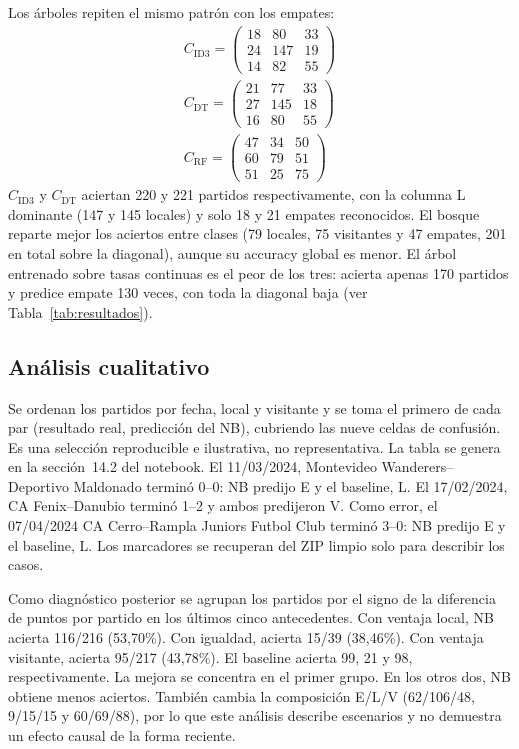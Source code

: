 \documentclass[conference]{IEEEtran}
\begin{document}
Los árboles repiten el mismo patrón con los empates:
\begin{gather*}
C_{\mathrm{ID3}}=
\begin{pmatrix}18&80&33\\24&147&19\\14&82&55\end{pmatrix}
\\[4pt]
C_{\mathrm{DT}}=
\begin{pmatrix}21&77&33\\27&145&18\\16&80&55\end{pmatrix}
\\[4pt]
C_{\mathrm{RF}}=
\begin{pmatrix}47&34&50\\60&79&51\\51&25&75\end{pmatrix}
\end{gather*}
$C_{\mathrm{ID3}}$ y $C_{\mathrm{DT}}$ aciertan 220 y 221 partidos respectivamente, con la columna L dominante (147 y 145 locales) y solo 18 y 21 empates reconocidos. El bosque reparte mejor los aciertos entre clases (79 locales, 75 visitantes y 47 empates, 201 en total sobre la diagonal), aunque su accuracy global es menor. El árbol entrenado sobre tasas continuas es el peor de los tres: acierta apenas 170 partidos y predice empate 130 veces, con toda la diagonal baja (ver Tabla~\ref{tab:resultados}).

\subsection{Análisis cualitativo}
Se ordenan los partidos por fecha, local y visitante y se toma el primero de cada par (resultado real, predicción del NB), cubriendo las nueve celdas de confusión. Es una selección reproducible e ilustrativa, no representativa. La tabla se genera en la sección~14.2 del notebook. El 11/03/2024, Montevideo Wanderers--Deportivo Maldonado terminó 0--0: NB predijo E y el baseline, L. El 17/02/2024, CA Fenix--Danubio terminó 1--2 y ambos predijeron V. Como error, el 07/04/2024 CA Cerro--Rampla Juniors Futbol Club terminó 3--0: NB predijo E y el baseline, L. Los marcadores se recuperan del ZIP limpio solo para describir los casos.

Como diagnóstico posterior se agrupan los partidos por el signo de la diferencia de puntos por partido en los últimos cinco antecedentes. Con ventaja local, NB acierta 116/216 (53,70\%). Con igualdad, acierta 15/39 (38,46\%). Con ventaja visitante, acierta 95/217 (43,78\%). El baseline acierta 99, 21 y 98, respectivamente. La mejora se concentra en el primer grupo. En los otros dos, NB obtiene menos aciertos. También cambia la composición E/L/V (62/106/48, 9/15/15 y 60/69/88), por lo que este análisis describe escenarios y no demuestra un efecto causal de la forma reciente.
\end{document}
